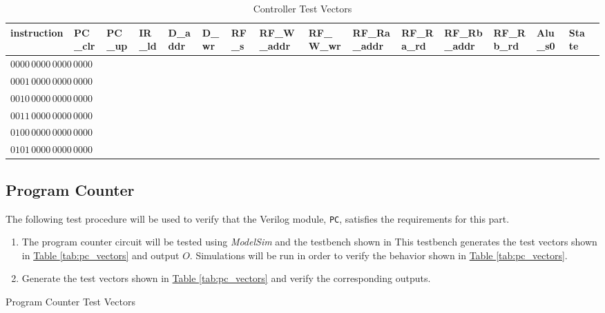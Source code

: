 \begin{sidewaystable}[htbp]
    \centering\scriptsize
        \begin{tabular}{llllllllllllllll} \toprule
            instruction              & PC\_clr   & PC\_up    & IR\_ld    & D\_addr   & D\_wr & RF\_s & RF\_W\_addr  & RF\_W\_wr    & RF\_Ra\_addr & RF\_Ra\_rd   & RF\_Rb\_addr & RF\_Rb\_rd   & Alu\_s0     & State \\\midrule
            $0000\,0000\,0000\,0000$ &   \\
            $0001\,0000\,0000\,0000$ &   \\
            $0010\,0000\,0000\,0000$ &   \\
            $0011\,0000\,0000\,0000$ &   \\
            $0100\,0000\,0000\,0000$ &   \\
            $0101\,0000\,0000\,0000$ &   \\
        \end{tabular}
    \caption{Controller Test Vectors\label{tab:controller_vectors}}
\end{sidewaystable}

\subsection{Program Counter} %
\label{sub:program_counter}

The following test procedure will be used to verify that the Verilog module, \verb|PC|, satisfies the requirements for this part.

\begin{enumerate}
    \item The program counter circuit will be tested using \emph{ModelSim} and the testbench shown in %
    This testbench generates the test vectors shown in \hyperref[tab:pc_vectors]{Table \ref*{tab:pc_vectors}} and output $O$.
    Simulations will be run in order to verify the behavior shown in \hyperref[tab:pc_vectors]{Table \ref*{tab:pc_vectors}}.
    \item Generate the test vectors shown in \hyperref[tab:pc_vectors]{Table \ref*{tab:pc_vectors}}
    and verify the corresponding outputs.
\end{enumerate}

\begin{table}[htbp]
    \centering
    \caption{Program Counter Test Vectors\label{tab:pc_vectors}}
\end{table}

